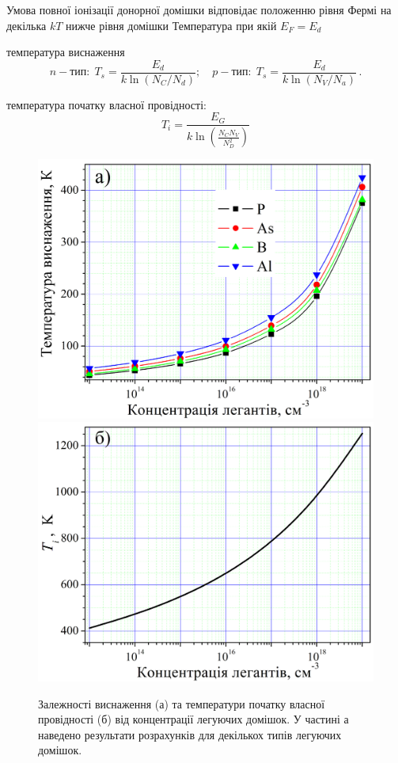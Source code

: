 \documentclass[12pt,a4paper,titlepage,oneside]{book}
\numberwithin{equation}{part}
\begin{document}
Умова повної іонізації донорної домішки відповідає положенню рівня Фермі на декілька $kT$
нижче рівня домішки
Температура при якій $E_F=E_d$

температура виснаження
\begin{equation}\label{eqTs}
  n-\text{тип}:\;T_s=\frac{E_d}{k\ln(N_C/N_d)};\quad p-\text{тип}:\;T_s=\frac{E_d}{k\ln(N_V/N_a)}\,.
\end{equation}


температура початку власної провідності:
\begin{equation}\label{eqTi}
  T_i=\frac{E_G}{k \ln\left(\frac{N_C N_V}{N_D^2}\right)}
\end{equation}

\begin{figure}
	\centering
     \includegraphics[width=0.49\linewidth]{FigTs.png}
     \includegraphics[width=0.49\linewidth]{FigTi.png}
	  \caption{Залежності виснаження (а) та температури початку власної провідності (б)
від концентрації легуючих домішок. У частині а наведено результати розрахунків для декількох типів легуючих домішок.
}\label{figTsTi}
\end{figure}
\end{document}
